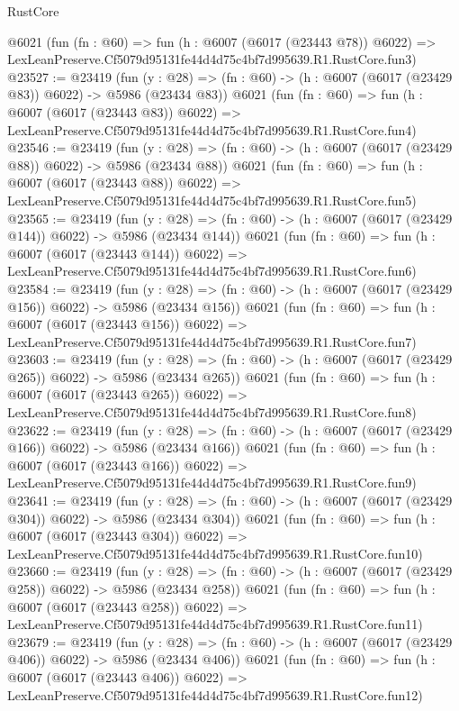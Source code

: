\begin{lexlean}{RustCore}
\begin{coremodule}
    @6021
    (fun (fn : @60) =>
    fun (h : @6007 (@6017 (@23443 @78)) @6022) =>
    LexLeanPreserve.Cf5079d95131fe44d4d75c4bf7d995639.R1.RustCore.fun3)
@23527 := @23419
    (fun (y : @28) => (fn : @60) -> (h : @6007 (@6017 (@23429 @83)) @6022) -> @5986 (@23434 @83))
    @6021
    (fun (fn : @60) =>
    fun (h : @6007 (@6017 (@23443 @83)) @6022) =>
    LexLeanPreserve.Cf5079d95131fe44d4d75c4bf7d995639.R1.RustCore.fun4)
@23546 := @23419
    (fun (y : @28) => (fn : @60) -> (h : @6007 (@6017 (@23429 @88)) @6022) -> @5986 (@23434 @88))
    @6021
    (fun (fn : @60) =>
    fun (h : @6007 (@6017 (@23443 @88)) @6022) =>
    LexLeanPreserve.Cf5079d95131fe44d4d75c4bf7d995639.R1.RustCore.fun5)
@23565 := @23419
    (fun (y : @28) => (fn : @60) -> (h : @6007 (@6017 (@23429 @144)) @6022) -> @5986 (@23434 @144))
    @6021
    (fun (fn : @60) =>
    fun (h : @6007 (@6017 (@23443 @144)) @6022) =>
    LexLeanPreserve.Cf5079d95131fe44d4d75c4bf7d995639.R1.RustCore.fun6)
@23584 := @23419
    (fun (y : @28) => (fn : @60) -> (h : @6007 (@6017 (@23429 @156)) @6022) -> @5986 (@23434 @156))
    @6021
    (fun (fn : @60) =>
    fun (h : @6007 (@6017 (@23443 @156)) @6022) =>
    LexLeanPreserve.Cf5079d95131fe44d4d75c4bf7d995639.R1.RustCore.fun7)
@23603 := @23419
    (fun (y : @28) => (fn : @60) -> (h : @6007 (@6017 (@23429 @265)) @6022) -> @5986 (@23434 @265))
    @6021
    (fun (fn : @60) =>
    fun (h : @6007 (@6017 (@23443 @265)) @6022) =>
    LexLeanPreserve.Cf5079d95131fe44d4d75c4bf7d995639.R1.RustCore.fun8)
@23622 := @23419
    (fun (y : @28) => (fn : @60) -> (h : @6007 (@6017 (@23429 @166)) @6022) -> @5986 (@23434 @166))
    @6021
    (fun (fn : @60) =>
    fun (h : @6007 (@6017 (@23443 @166)) @6022) =>
    LexLeanPreserve.Cf5079d95131fe44d4d75c4bf7d995639.R1.RustCore.fun9)
@23641 := @23419
    (fun (y : @28) => (fn : @60) -> (h : @6007 (@6017 (@23429 @304)) @6022) -> @5986 (@23434 @304))
    @6021
    (fun (fn : @60) =>
    fun (h : @6007 (@6017 (@23443 @304)) @6022) =>
    LexLeanPreserve.Cf5079d95131fe44d4d75c4bf7d995639.R1.RustCore.fun10)
@23660 := @23419
    (fun (y : @28) => (fn : @60) -> (h : @6007 (@6017 (@23429 @258)) @6022) -> @5986 (@23434 @258))
    @6021
    (fun (fn : @60) =>
    fun (h : @6007 (@6017 (@23443 @258)) @6022) =>
    LexLeanPreserve.Cf5079d95131fe44d4d75c4bf7d995639.R1.RustCore.fun11)
@23679 := @23419
    (fun (y : @28) => (fn : @60) -> (h : @6007 (@6017 (@23429 @406)) @6022) -> @5986 (@23434 @406))
    @6021
    (fun (fn : @60) =>
    fun (h : @6007 (@6017 (@23443 @406)) @6022) =>
    LexLeanPreserve.Cf5079d95131fe44d4d75c4bf7d995639.R1.RustCore.fun12)

\end{coremodule}
\end{lexlean}
